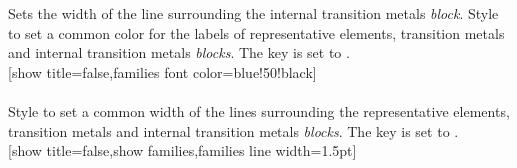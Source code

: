 \label{option_itm family line width}%
%
{Sets the width of the line surrounding the internal transition metals \textit{block}.}%
\label{style_families_font_color}%
%
{Style to set a common color for the labels of representative elements, transition metals and internal transition metals \textit{blocks}. The key  is set to .
}%
\\ [5pt][show title=false,families font color=blue!50!black]%
\\ [5pt]\makebox[\linewidth][c]{\scalebox{.6}{\pgfPT[show title=false,families font color=blue!50!black]}}%
\\ [0pt]\pgfPTendstyle%
\label{style_families line width}%
%
{Style to set a common width of the lines surrounding the representative elements, transition metals and internal transition metals \textit{blocks}.
The key  is set to .
}%
\\ [5pt][show title=false,show families,families line width=1.5pt]%
\\ [5pt]\makebox[\linewidth][c]{\scalebox{.6}{\pgfPT[show title=false,show families,families line width=1.5pt]}}%
\\ [0pt]\pgfPTendstyle%
\label{style_families}%
%
